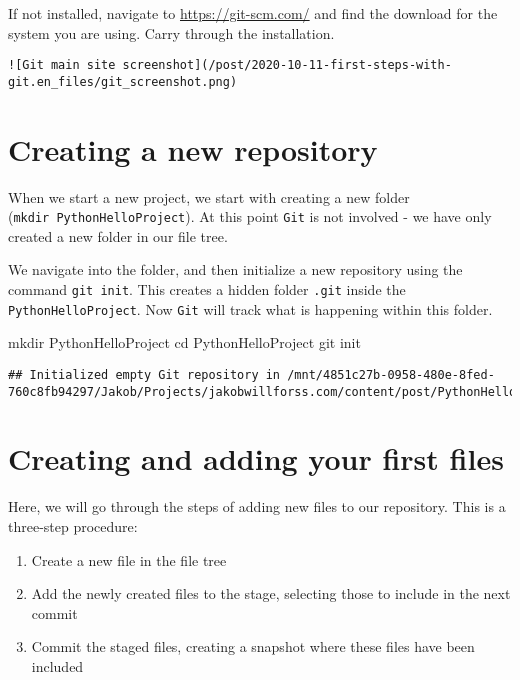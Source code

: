 \documentclass[]{article}
\newenvironment{Shaded}{\begin{snugshade}}{\end{snugshade}}
\newcommand{\BuiltInTok}[1]{#1}
\newcommand{\FunctionTok}[1]{\textcolor[rgb]{0.00,0.00,0.00}{#1}}
\newcommand{\NormalTok}[1]{#1}
\providecommand{\tightlist}{%
  \setlength{\itemsep}{0pt}\setlength{\parskip}{0pt}}
\begin{document}
If not installed, navigate to \url{https://git-scm.com/} and find the
download for the system you are using. Carry through the installation.

\begin{verbatim}
![Git main site screenshot](/post/2020-10-11-first-steps-with-git.en_files/git_screenshot.png)
\end{verbatim}

\hypertarget{creating-a-new-repository}{%
\section{Creating a new repository}\label{creating-a-new-repository}}

When we start a new project, we start with creating a new folder
(\texttt{mkdir\ PythonHelloProject}). At this point \texttt{Git} is not
involved - we have only created a new folder in our file tree.

We navigate into the folder, and then initialize a new repository using
the command \texttt{git\ init}. This creates a hidden folder
\texttt{.git} inside the \texttt{PythonHelloProject}. Now \texttt{Git}
will track what is happening within this folder.

\begin{Shaded}
\begin{Highlighting}[]
\FunctionTok{mkdir}\NormalTok{ PythonHelloProject}
\BuiltInTok{cd}\NormalTok{ PythonHelloProject}
\FunctionTok{git}\NormalTok{ init}
\end{Highlighting}
\end{Shaded}

\begin{verbatim}
## Initialized empty Git repository in /mnt/4851c27b-0958-480e-8fed-760c8fb94297/Jakob/Projects/jakobwillforss.com/content/post/PythonHelloProject/.git/
\end{verbatim}

\hypertarget{creating-and-adding-your-first-files}{%
\section{Creating and adding your first
files}\label{creating-and-adding-your-first-files}}

Here, we will go through the steps of adding new files to our
repository. This is a three-step procedure:

\begin{enumerate}
\def\labelenumi{\arabic{enumi}.}
\tightlist
\item
  Create a new file in the file tree
\item
  Add the newly created files to the stage, selecting those to include
  in the next commit
\item
  Commit the staged files, creating a snapshot where these files have
  been included
\end{enumerate}
\end{document}
